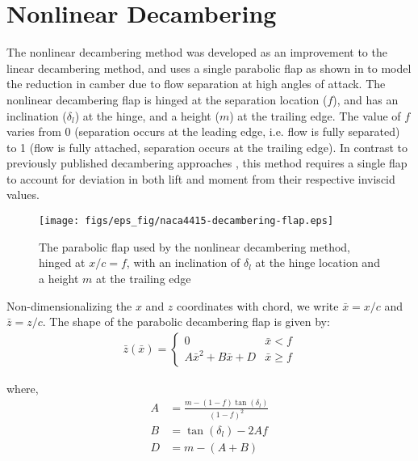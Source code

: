 \section{Nonlinear Decambering}
\label{sec:nonlin-decambering}
The nonlinear decambering method \cite{Narsipur2018} was developed as an improvement to the linear decambering method, and uses a single parabolic flap as shown in  to model the reduction in camber due to flow separation at high angles of attack. The nonlinear decambering flap is hinged at the separation location ($f$), and has an inclination ($\delta_l$) at the hinge, and a height ($m$) at the trailing edge. The value of $f$ varies from 0 (separation occurs at the leading edge, i.e. flow is fully separated) to 1 (flow is fully attached, separation occurs at the trailing edge).
In contrast to previously published decambering approaches \cite{Mukherjee_poststall_2006,Paul_Gopa_Iteration_Schemes,gopalarathnam_paul_petrilli_ASM_2012}, this method requires a single flap to account for deviation in both lift and moment from their respective inviscid values.

\begin{figure}[!ht]
    \centering
    \texttt{[image: figs/eps\_fig/naca4415-decambering-flap.eps]}
    \caption{The parabolic flap used by the nonlinear decambering method, hinged at $x/c = f$, with an inclination of $\delta_l$ at the hinge location and a height $m$ at the trailing edge}
    \label{fig:nld-flap-illustration}
\end{figure}


Non-dimensionalizing the $x$ and $z$ coordinates with chord, we write $\bar{x} = x/c$ and $\bar{z} = z/c$.
The shape of the parabolic decambering flap is given by:
\begin{align}
    \bar{z}\left(\bar{x}\right) = \begin{cases}
    0 & \bar{x} < f \\
    A\bar{x}^2 + B\bar{x} + D & \bar{x} \geq f
    \end{cases} \label{eqn:decambering-camberline}
\end{align}

\noindent where,
\begin{align}
    A &= \frac{m - (1 - f)\tan(\delta_l)}{(1 - f)^2} \label{eqn:decambering-A} \\
    B &= \tan(\delta_l) - 2 A f \label{eqn:decambering-B}  \\
    D &= m - (A + B) \label{eqn:decambering-D}
\end{align}

